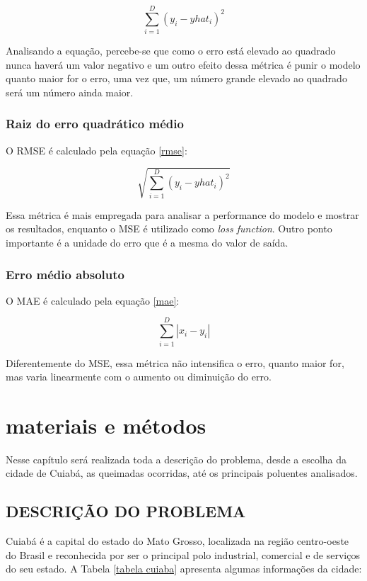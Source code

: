 \documentclass[
  12pt,		%
  a4paper,	%
  openright,%
  oneside,	%
  chapter=TITLE,		%
  section=TITLE,		%
  english,	%
  french,	%
  spanish,	%
  brazil	%
]{abntex2}
\begin{document}
    \begin{equation}
        \label{mse}
        \sum_{i=1}^{D}(y_i-yhat_i)^2
    \end{equation}

    Analisando a equação, percebe-se que como o erro está elevado ao quadrado nunca haverá um valor negativo e
    um outro efeito dessa métrica é punir o modelo quanto maior for o erro, uma vez que, um número grande elevado ao quadrado
    será um número ainda maior.
    
    \subsection{Raiz do erro quadrático médio}
    O RMSE é calculado pela equação \ref*{rmse}: 

    \begin{equation}
        \label{rmse}
        \sqrt{\sum_{i=1}^{D}(y_i-yhat_i)^2}
    \end{equation}
    
    Essa métrica é mais empregada para analisar a performance do modelo e mostrar os resultados, enquanto o
    MSE é utilizado como \textit{loss function}. Outro ponto importante é a unidade do erro que é a mesma do valor de saída.
    \subsection{Erro médio absoluto}
    O MAE é calculado pela equação \ref*{mae}: 

    \begin{equation}
        \label{mae}
        \sum_{i=1}^{D}|x_i-y_i|
    \end{equation}

    Diferentemente do MSE, essa métrica não intensifica o erro, quanto maior for, mas varia linearmente com o aumento
    ou diminuição do erro.
    
    \chapter{materiais e métodos}
    Nesse capítulo será realizada toda a descrição do problema, desde a escolha da cidade de Cuiabá,
    as queimadas ocorridas, até os principais poluentes analisados.

    \section{DESCRIÇÃO DO PROBLEMA}
    Cuiabá é a capital do estado do Mato Grosso, localizada na região centro-oeste do Brasil e reconhecida
    por ser o principal polo industrial, comercial e de serviços do seu estado. A Tabela \ref*{tabela cuiaba} apresenta algumas informações
    da cidade:
\end{document}
